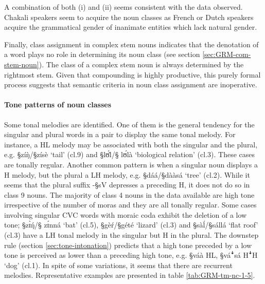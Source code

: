 A combination of both (i) and (ii) seems consistent with the data
observed. Chakali speakers seem to acquire the noun classes as French or Dutch
speakers acquire
the grammatical gender of inanimate entities which lack natural gender.


Finally, class assignment in complex stem nouns indicates  that the 
denotation of a word plays no role in determining its noun
class (see section \ref{sec:GRM-com-stem-noun}). 
The class of a complex stem noun is always determined by the rightmost stem.
Given that compounding is highly productive,  this purely  formal
process suggests that semantic criteria in
noun class assignment are inoperative.

\paragraph{Tone patterns of noun classes}
\label{sec:GRM-tone-p}

Some tonal melodies are identified. One of them is the  general tendency for
the singular and  plural words in a pair to display the same tonal melody. For
instance, a HL melody may be associated with both the singular and the plural,
e.g.  {\S zíŋ̀}/{\S zísè} `tail' ({\sc cl.9}) 
and   {\S lʊ́l̀}/{\S
lʊ́là} `biological relation'  ({\sc cl.3}). These cases are tonally regular. 
Another common pattern is when a singular noun displays a H melody, but the
plural a LH melody, e.g.  {\S dáá}/{\S dààsá} `tree' ({\sc cl.2}). While it
 seems that  the
plural suffix -{\S sV}  depresses a preceding H,  it does not do so in class 9
nouns.
The majority of class 4 nouns in the data available are high tone irrespective
of the number of moras and they are all tonally regular. Some cases involving
singular CVC words with moraic
coda exhibit the deletion of a low tone;  {\S zɪ̀ŋ́}/{\S
zɪ́nná} `bat' ({\sc cl.5}),   {\S gèŕ}/{\S gété} `lizard' ({\sc cl.3}) and
{\S sàĺ}/{\S sállá} `flat roof' ({\sc cl.3})  have a LH tonal melody in the
singular but  H in the plural. The downstep rule (section
\ref{sec:tone-intonation})  predicts that a high tone preceded by a low tone is
perceived as lower than a preceding high
tone, e.g. {\S váà} {\I HL},  {\S váꜜsá} {\I HꜜH}  `dog' ({\sc cl.1}).  In
spite of some variations,  it seems that there are recurrent
melodies. Representative examples are presented in
table \ref{tab:GRM-tm-nc-1-5}.
 
